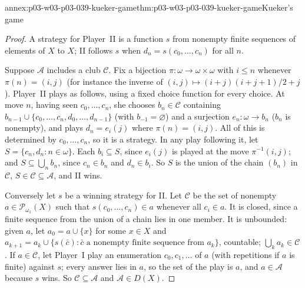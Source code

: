 \begin{annexitem}{annex:p03-w03-p03-039-kueker-game}{thm:p03-w03-p03-039-kueker-game}{Kueker's game}
\begin{proof}
A strategy for Player~II is a function \(s\) from nonempty finite sequences
of elements of \(X\) to \(X\); II follows \(s\) when
\(d_n=s(c_0,\ldots,c_n)\) for all \(n\).

Suppose \(\mathcal A\) includes a club \(\mathcal C\). Fix a bijection
\(\pi:\omega\to\omega\times\omega\) with \(i\le n\) whenever
\(\pi(n)=(i,j)\) (for instance the inverse of
\((i,j)\mapsto(i+j)(i+j+1)/2+j\)). Player~II plays as follows, using a fixed
choice function for every choice. At move \(n\), having seen
\(c_0,\ldots,c_n\), she chooses \(b_n\in\mathcal C\) containing
\(b_{n-1}\cup\{c_0,\ldots,c_n,d_0,\ldots,d_{n-1}\}\) (with
\(b_{-1}=\varnothing\)) and a surjection \(e_n:\omega\to b_n\) (\(b_n\) is
nonempty), and plays \(d_n=e_i(j)\) where \(\pi(n)=(i,j)\). All of this is
determined by \(c_0,\ldots,c_n\), so it is a strategy. In any play following
it, let \(S=\{c_n,d_n:n\in\omega\}\). Each \(b_i\subseteq S\), since
\(e_i(j)\) is played at the move \(\pi^{-1}(i,j)\); and \(S\subseteq\bigcup_nb_n\),
since \(c_n\in b_n\) and \(d_n\in b_i\). So \(S\) is the union of the chain
\((b_n)\) in \(\mathcal C\), \(S\in\mathcal C\subseteq\mathcal A\), and II wins.

Conversely let \(s\) be a winning strategy for II. Let \(\mathcal C\) be the
set of nonempty \(a\in\mathcal P_{\omega_1}(X)\) such that
\(s(c_0,\ldots,c_n)\in a\) whenever all \(c_i\in a\). It is closed, since a
finite sequence from the union of a chain lies in one member. It is
unbounded: given \(a\), let \(a_0=a\cup\{x\}\) for some \(x\in X\) and
\(a_{k+1}=a_k\cup\{s(\bar c):\bar c\text{ a nonempty finite sequence from }a_k\}\),
countable; \(\bigcup_ka_k\in\mathcal C\). If \(a\in\mathcal C\), let Player~I
play an enumeration \(c_0,c_1,\ldots\) of \(a\) (with repetitions if \(a\)
is finite) against \(s\); every answer lies in \(a\), so the set of the play
is \(a\), and \(a\in\mathcal A\) because \(s\) wins. So
\(\mathcal C\subseteq\mathcal A\) and \(\mathcal A\in D(X)\).
\end{proof}
\end{annexitem}


